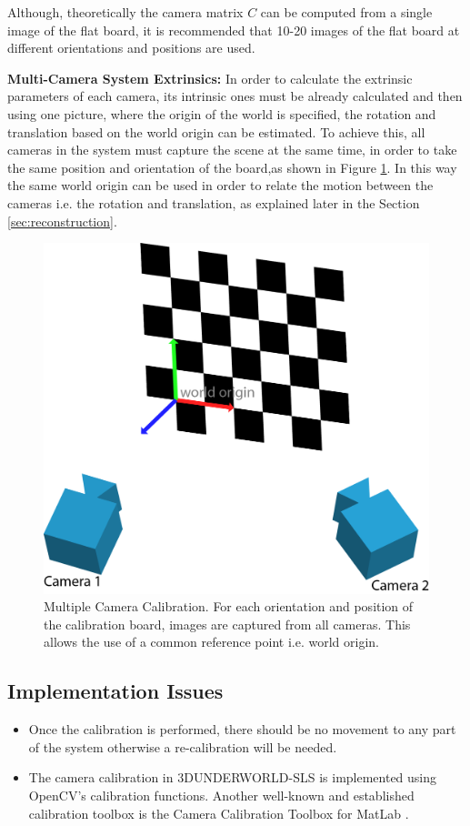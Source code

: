 \documentclass[final,12pt,3p]{elsarticle}
\begin{document}
Although, theoretically the camera matrix $C$ can be computed from a single image of the flat board, it is recommended that 10-20 images of the flat board at different orientations and positions are used. 

\textbf{Multi-Camera System Extrinsics:} In order to calculate the extrinsic parameters of each camera, its intrinsic ones must be already calculated and then using one picture, where the origin of the world is specified, the rotation and translation based on the world origin can be estimated. To achieve this, all cameras in the system must capture the scene at the same time, in order to take the same position and orientation of the board,as shown in Figure \ref{fig:calibration}. In this way the same world origin can be used in order to relate the motion between the cameras i.e. the rotation and translation, as explained later in the Section \ref{sec:reconstruction}.  

\begin{figure}[!ht]
	\centering
	\includegraphics[scale=0.6]{./extrCalib.png}
	\caption{\label{fig:calibration} Multiple Camera Calibration. For each orientation and position of the calibration board, images are captured from all cameras. This allows the use of a common reference point i.e. world origin.}
\end{figure}

\subsection{Implementation Issues}
\begin{itemize}
\item Once the calibration is performed, there should be no movement to any part of the system otherwise a re-calibration will be needed. 
\item The camera calibration in 3DUNDERWORLD-SLS is implemented using OpenCV's calibration functions. Another well-known and established calibration toolbox is the Camera Calibration Toolbox for MatLab \cite{bouguet2004camera}.
\end{itemize}
\end{document}
